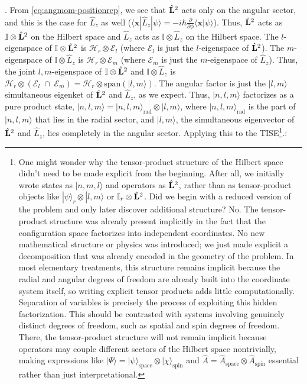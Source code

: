 {}. From \cref{eq:angmom-positionrep}, we see that $\hat{\mathbf{L}}^2$ acts only on the angular sector, and this is the case for $\hat{L}_z$ as well ($\langle \mathbf{x}|\hat{L}_z|\psi\rangle=-i\hbar\frac{\partial}{\partial\phi}\langle\mathbf{x}|\psi\rangle$). Thus, $\hat{\mathbf{L}}^2$ acts as $\mathbb{I}\otimes \hat{\mathbf{L}}^2$ on the Hilbert space and $\hat{L}_z$ acts as $\mathbb{I}\otimes \hat{L}_z$ on the Hilbert space. The $l$-eigenspace of $\mathbb{I}\otimes \hat{\mathbf{L}}^2$ is $\mathcal{H}_r\otimes\mathcal{E}_l$ (where $\mathcal{E}_l$ is just the $l$-eigenspace of $\hat{\mathbf{L}}^2$). The $m$-eigenspace of $\mathbb{I}\otimes \hat{L}_z$ is $\mathcal{H}_r\otimes \mathcal{E}_m$ (where $\mathcal{E}_m$ is just the $m$-eigenspace of $\hat{L}_z$). Thus, the joint $l,m$-eigenspace of $\mathbb{I}\otimes\hat{\mathbf{L}}^2$ and $\mathbb{I}\otimes\hat{L}_z$ is $\mathcal{H}_r\otimes(\mathcal{E}_l\;\cap\;\mathcal{E}_m) = \mathcal{H}_r\otimes\text{span}(|l,m\rangle)$. The angular factor is just the $|l,m\rangle$ simultaneous eigenket of $\hat{\mathbf{L}}^2$ and $\hat{L}_z$, as we expect. Thus, $|n,l,m\rangle$ factorizes as a pure product state, $|n,l,m\rangle=|n,l,m\rangle_\text{rad}\otimes|l,m\rangle$, where $|n,l,m\rangle_\text{rad}$ is the part of $|n,l,m\rangle$ that lies in the radial sector, and $|l,m\rangle$, the simultaneous eigenvector of $\hat{\mathbf{L}}^2$ and $\hat{L}_z$, lies completely in the angular sector. Applying this to the TISE\footnote{
One might wonder why the tensor-product structure of the Hilbert space didn't need to be made explicit from the beginning. After all, we initially wrote states as $|n,m,l\rangle$ and operators as $\hat{\mathbf{L}}^2$, rather than as tensor-product objects like $|\psi\rangle_r\otimes|l,m\rangle$ or $\mathbb{I}_r\otimes\hat{\mathbf{L}}^2$. Did we begin with a reduced version of the problem and only later discover additional structure? No. The tensor-product structure was already present implicitly in the fact that the configuration space factorizes into independent coordinates. No new mathematical structure or physics was introduced; we just made explicit a decomposition that was already encoded in the geometry of the problem. In most elementary treatments, this structure remains implicit because the radial and angular degrees of freedom are already built into the coordinate system itself, so writing explicit tensor products adds little computationally. Separation of variables is precisely the process of exploiting this hidden factorization. This should be contrasted with systems involving genuinely distinct degrees of freedom, such as spatial and spin degrees of freedom. There, the tensor-product structure will not remain implicit because operators may couple different sectors of the Hilbert space nontrivially, making expressions like $|\Psi\rangle=|\psi\rangle_\text{space}\otimes|\chi\rangle_\text{spin}$ and $\hat{A}=\hat{A}_\text{space}\otimes \hat{A}_\text{spin}$ essential rather than just interpretational.
}.:
